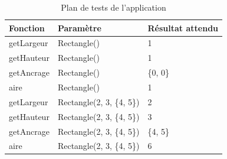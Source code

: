\begin{table}[H]
    \centering
    \caption{Plan de tests de l'application}
    \begin{tabular}{p{2in}p{2in}p{2in}}
        \hline
        \bfseries Fonction & \bfseries Paramètre & \bfseries Résultat attendu\\
        \hline
        getLargeur & Rectangle() & 1\\
        getHauteur & Rectangle() & 1\\
        getAncrage & Rectangle() & \{0, 0\}\\
        aire & Rectangle() & 1\\
        \hline
        getLargeur & Rectangle(2, 3, \{4, 5\}) & 2\\
        getHauteur & Rectangle(2, 3, \{4, 5\}) & 3\\
        getAncrage & Rectangle(2, 3, \{4, 5\}) & \{4, 5\}\\
        aire & Rectangle(2, 3, \{4, 5\}) & 6\\
        \hline
    \end{tabular}
\end{table}
